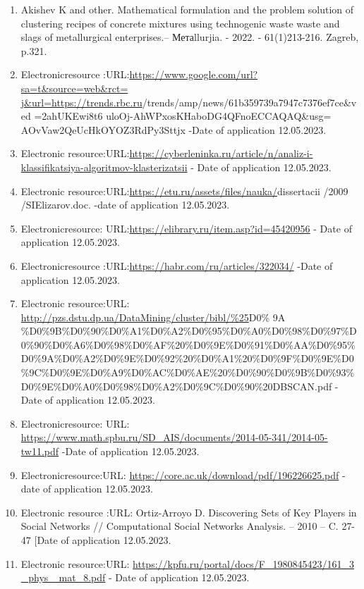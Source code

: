 \begin{enumerate}
\item
Akishev K and other. Mathematical formulation and the problem
solution of clustering recipes of concrete mixtures using technogenic
waste waste and slags of metallurgical enterprises.-- Метаllurjia. -
2022. - 61(1)213-216. Zagreb, p.321.

\item
Electronicresource
:URL:\href{https://www.google.com/url?sa=t\&source=web\&rct=\%20j\&url=https://trends.rbc.ru}{https://www.google.com/url?sa=t\&source=web\&rct=
j\&url=https://trends.rbc.ru}/trends/amp/news/61b359739a7947c7376ef7ce\&ved
=2ahUKEwi8t6 uloOj-AhWPxosKHaboDG4QFnoECCAQAQ\&usg=
AOvVaw2QeUcHkOYOZ3RdPy3Sttjx -Date of application 12.05.2023.

\item
Electronic
resource:URL:\url{https://cyberleninka.ru/article/n/analiz-i-klassifikatsiya-algoritmov-klasterizatsii}
- Date of application 12.05.2023.

\item
Electronic
resource:URL:\url{https://etu.ru/assets/files/nauka/}dissertacii /2009
/SIElizarov.doc. -date of application 12.05.2023.

\item
Electronicresource:
URL:\url{https://elibrary.ru/item.asp?id=45420956} - Date of application
12.05.2023.

\item
Electronicresource :URL:\url{https://habr.com/ru/articles/322034/}
-Date of application 12.05.2023.

\item
Electronic resource:URL:
\url{http://pzs.dstu.dp.ua/DataMining/cluster/bibl/\%25}D0\% 9A
\%D0\%9B\%D0\%90\%D0\%A1\%D0\%A2\%D0\%95\%D0\%A0\%D0\%98\%D0\%97\%D0\%90\%D0\%A6\%D0\%98\%D0\%AF\%20\%D0\%9E\%D0\%91\%D0\%AA\%D0\%95\%D0\%9A\%D0\%A2\%D0\%9E\%D0\%92\%20\%D0\%A1\%20\%D0\%9F\%D0\%9E\%D0\%9C\%D0\%9E\%D0\%A9\%D0\%AC\%D0\%AE\%20\%D0\%90\%D0\%9B\%D0\%93\%D0\%9E\%D0\%A0\%D0\%98\%D0\%A2\%D0\%9C\%D0\%90\%20DBSCAN.pdf
- Date of application 12.05.2023.

\item
Electronicresource: URL:
\url{https://www.math.spbu.ru/SD_AIS/documents/2014-05-341/2014-05-tw11.pdf}
-Date of application 12.05.2023.

\item
Electronicresource:URL:
\url{https://core.ac.uk/download/pdf/196226625.pdf} - date of
application 12.05.2023.

\item
Electronic resource :URL: Ortiz-Arroyo D. Discovering Sets of Key
Players in Social Networks // Computational Social Networks Analysis. --
2010 -- C. 27-47 {[}Date of application 12.05.2023.

\item
Electronic resource:URL:
\href{https://kpfu.ru/portal/docs/F_1980845423/161_3\%20_phys\%20_mat_8.pdf}{https://kpfu.ru/portal/docs/F\_1980845423/161\_3
\_phys \_mat\_8.pdf} - Date of application 12.05.2023.
\end{enumerate}

